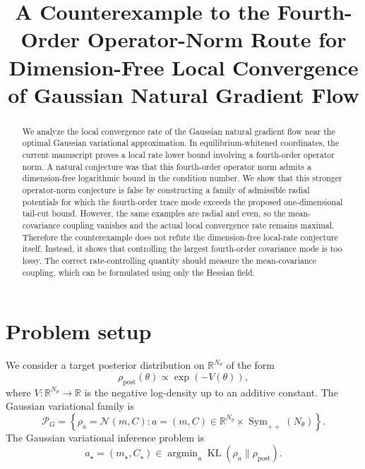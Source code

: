 \documentclass[11pt]{article}
\title{A Counterexample to the Fourth-Order Operator-Norm Route for Dimension-Free Local Convergence of Gaussian Natural Gradient Flow}
\author{}
\date{}
\numberwithin{equation}{section}
\DeclareMathOperator{\KL}{KL}
\DeclareMathOperator{\Sym}{Sym}
\DeclareMathOperator{\argmin}{argmin}
\begin{document}
\maketitle

\begin{abstract}
We analyze the local convergence rate of the Gaussian natural gradient flow near the optimal Gaussian variational approximation. 
In equilibrium-whitened coordinates, the current manuscript proves a local rate lower bound involving a fourth-order operator norm. 
A natural conjecture was that this fourth-order operator norm admits a dimension-free logarithmic bound in the condition number. 
We show that this stronger operator-norm conjecture is false by constructing a family of admissible radial potentials for which the fourth-order trace mode exceeds the proposed one-dimensional tail-cut bound. 
However, the same examples are radial and even, so the mean-covariance coupling vanishes and the actual local convergence rate remains maximal. 
Therefore the counterexample does not refute the dimension-free local-rate conjecture itself. 
Instead, it shows that controlling the largest fourth-order covariance mode is too lossy. 
The correct rate-controlling quantity should measure the mean-covariance coupling, which can be formulated using only the Hessian field.
\end{abstract}

\section{Problem setup}

We consider a target posterior distribution on $\mathbb R^{N_\theta}$ of the form
\begin{equation}
    \rho_{\mathrm{post}}(\theta) \propto \exp(-V(\theta)),
\end{equation}
where $V:\mathbb R^{N_\theta}\to \mathbb R$ is the negative log-density up to an additive constant. 
The Gaussian variational family is
\begin{equation}
    \mathcal P_G
    =
    \left\{
    \rho_a = \mathcal N(m,C):
    a=(m,C)\in \mathbb R^{N_\theta}\times \Sym_{++}(N_\theta)
    \right\}.
\end{equation}
The Gaussian variational inference problem is
\begin{equation}
    a_\star=(m_\star,C_\star)
    \in
    \argmin_a \KL(\rho_a\|\rho_{\mathrm{post}}).
\end{equation}
\end{document}
